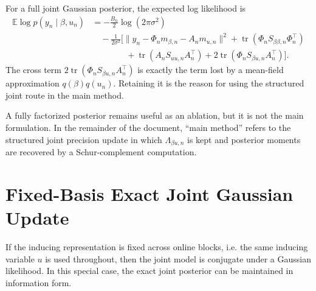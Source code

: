 \documentclass[12pt]{article}
\newcommand{\E}{\mathbb{E}}
\newcommand{\tr}{\operatorname{tr}}
\begin{document}
For a full joint Gaussian posterior, the expected log likelihood is
\begin{align}
    \E\log p(y_n\mid \beta,u_n)
    &=-\frac{B_n}{2}\log(2\pi\sigma^2) \\
    &\quad
    -\frac{1}{2\sigma^2}
    \Big[
        \|y_n-\Phi_nm_{\beta,n}-A_nm_{u,n}\|^2
        +\tr(\Phi_nS_{\beta\beta,n}\Phi_n^\top)  \\
    &\qquad\qquad
        +\tr(A_nS_{uu,n}A_n^\top)
        +2\tr(\Phi_nS_{\beta u,n}A_n^\top)
    \Big].
    \label{eq:structured-expected-log-likelihood}
\end{align}
The cross term $2\tr(\Phi_nS_{\beta u,n}A_n^\top)$ is exactly the term lost by
a mean-field approximation $q(\beta)q(u_n)$. Retaining it is the reason for
using the structured joint route in the main method.

A fully factorized posterior remains useful as an ablation, but it is not the
main formulation. In the remainder of the document, ``main method'' refers to
the structured joint precision update in which $\Lambda_{\beta u,n}$ is kept
and posterior moments are recovered by a Schur-complement computation.

\section{Fixed-Basis Exact Joint Gaussian Update}

If the inducing representation is fixed across online blocks, i.e. the same inducing
variable $u$ is used throughout, then the joint model is conjugate under a Gaussian
likelihood. In this special case, the exact joint posterior can be maintained in
information form.
\end{document}
